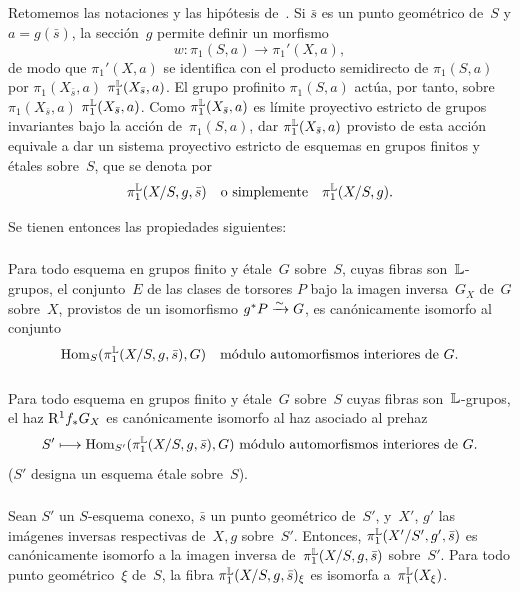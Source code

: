 
\setcounter{subsection}{4}
\subsection{}
\label{XIII.4.5}
Retomemos las notaciones y las hipótesis de~. Si
$\bar{s}$ es un punto geométrico de~$S$ y $a=g(\bar{s})$,
la sección~$g$ permite definir un morfismo
$$
w\colon \pi_1(S,a)\to \pi_1'(X,a),
$$
de modo que $\pi_1'(X,a)$ se identifica con el producto semidirecto de
$\pi_1(S,a)$ por
{$\pi_1(X_{\bar{s}},a)$}
{$\pi_1^\mathbb L(X_{\bar{s}},a)$}.
El grupo profinito $\pi_1(S,a)$ actúa, por tanto, sobre
{$\pi_1(X_{\bar{s}},a)$}
{$\pi_1^\mathbb L(X_{\bar{s}},a)$}.
Como $\pi_1^\mathbb L(X_{\bar{s}},a)$ es límite proyectivo estricto de grupos
invariantes bajo la acción de~$\pi_1(S,a)$, dar
$\pi_1^\mathbb L(X_{\bar{s}},a)$ provisto de esta acción equivale
a dar un sistema proyectivo estricto de esquemas
en grupos finitos y étales sobre~$S$, que se denota por
$$
\pi_1^\mathbb L(X/S,g,\bar{s})\quad\text{o
simplemente}\quad\pi_1^\mathbb L(X/S,g).
$$
\label{indnot:mk}%

Se tienen entonces las propiedades siguientes:
\setcounter{subsubsection}{0}

\subsubsection{}
\label{XIII.4.5.1}
Para todo esquema en grupos finito y étale~$G$ sobre~$S$, cuyas
fibras son~$\mathbb L$-grupos, el conjunto~$E$ de las clases de torsores
$P$ bajo la imagen inversa~$G_X$ de~$G$ sobre~$X$, provistos de un
isomorfismo $g^*P\xrightarrow{\sim} G$, es canónicamente isomorfo al conjunto
$$
\operatorname{Hom}_S(\pi_1^\mathbb L(X/S,g,\bar{s}),G) \quad\text{módulo automorfismos
interiores de~$G$.}
$$

\subsubsection{}
\label{XIII.4.5.2}
Para todo esquema en grupos finito y étale~$G$ sobre~$S$ cuyas
fibras son~$\mathbb L$-grupos, el haz $\mathrm{R}^1f_*G_X$ es
canónicamente isomorfo al haz asociado al prehaz
$$
S'\longmapsto \operatorname{Hom}_{S'}(\pi_1^\mathbb L(X/S,g,\bar{s}),G)\
\text{módulo automorfismos interiores de~$G$.}
$$
($S'$ designa un esquema étale sobre~$S$).

\subsubsection{}
\label{XIII.4.5.3}
Sean
$S'$ un $S$-esquema conexo, $\bar{s}$ un punto geométrico de~$S'$, y~$X'$,
$g'$ las imágenes inversas respectivas de~$X,g$ sobre~$S'$. Entonces,
$\pi_1^\mathbb L(X'/S',g',\bar{s})$ es canónicamente isomorfo a
la imagen inversa de~$\pi_1^\mathbb L(X/S,g,\bar{s})$ sobre~$S'$. Para todo
punto geométrico~$\xi$ de~$S$, la fibra
$\pi_1^\mathbb L(X/S,g,\bar{s})_\xi$ es isomorfa a~$\pi_1^\mathbb L(X_\xi)$.

